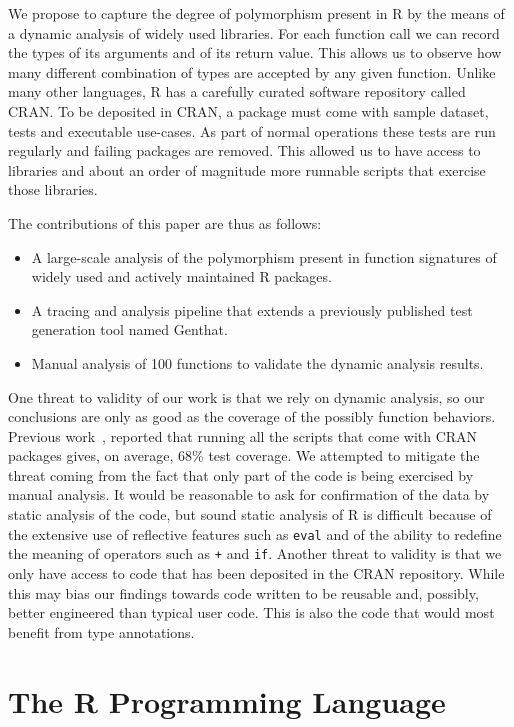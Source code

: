 \documentclass[acmsmall,10pt,review,anonymous]{acmart}\settopmatter{printfolios=true,printccs=false,printacmref=false}
\newcommand{\code}[1]{\lstinline|#1|\xspace}
\newcommand{\genthat}{{\sc Genthat}\xspace}
\begin{document}
We propose to capture the degree of polymorphism present in R by the means
of a dynamic analysis of widely used libraries. For each function call we
can record the types of its arguments and of its return value. This allows
us to observe how many different combination of types are accepted by any
given function. Unlike many other languages, R has a carefully curated
software repository called CRAN. To be deposited in CRAN, a package must
come with sample dataset, tests and executable use-cases. As part of normal
operations these tests are run regularly and failing packages are removed.
This allowed us to have access to \PACKAGES libraries and about an order of
magnitude more runnable scripts that exercise those libraries.

The contributions of this paper are thus as follows:
\begin{itemize}
\item A large-scale analysis of the polymorphism present in function
  signatures of \PACKAGES widely used and actively maintained R packages.
\item A tracing and analysis pipeline that extends a previously published
  test generation tool named \genthat.
\item Manual analysis of 100 functions to validate the dynamic analysis
  results.
\end{itemize}

One threat to validity of our work is that we rely on dynamic analysis, so
our conclusions are only as good as the coverage of the possibly function
behaviors. Previous work~\cite{issta18}, reported that running all the
scripts that come with CRAN packages gives, on average, 68\% test coverage.
We attempted to mitigate the threat coming from the fact that only part of
the code is being exercised by manual analysis. It would be reasonable to
ask for confirmation of the data by static analysis of the code, but sound
static analysis of R is difficult because of the extensive use of reflective
features such as \code{eval} and of the ability to redefine the meaning of
operators such as \code{+} and \code{if}.  Another threat to validity is
that we only have access to code that has been deposited in the CRAN
repository. While this may bias our findings towards code written to be
reusable and, possibly, better engineered than typical user code. This is
also the code that would most benefit from type annotations.

\newpage  %

\section{The R Programming Language}\label{sec:rlang}
\end{document}
